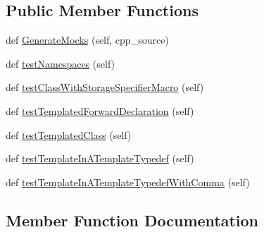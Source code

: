 \subsection*{Public Member Functions}
\begin{DoxyCompactItemize}
\item 
def \hyperlink{classcpp_1_1gmock__class__test_1_1_generate_mocks_test_afdce6749dca14c1aa90762d389d92c87}{Generate\+Mocks} (self, cpp\+\_\+source)
\item 
def \hyperlink{classcpp_1_1gmock__class__test_1_1_generate_mocks_test_a706812da9e8f79a689c707b4032db2d2}{test\+Namespaces} (self)
\item 
def \hyperlink{classcpp_1_1gmock__class__test_1_1_generate_mocks_test_aba1ab8ae8a897ea9c22a47bcd1524254}{test\+Class\+With\+Storage\+Specifier\+Macro} (self)
\item 
def \hyperlink{classcpp_1_1gmock__class__test_1_1_generate_mocks_test_a18cb0f03ecd4e54d0f787694c1513731}{test\+Templated\+Forward\+Declaration} (self)
\item 
def \hyperlink{classcpp_1_1gmock__class__test_1_1_generate_mocks_test_a4098c99b66f0cbea7be9e66352a20f4d}{test\+Templated\+Class} (self)
\item 
def \hyperlink{classcpp_1_1gmock__class__test_1_1_generate_mocks_test_a32a2840352d970c631d7be1b6d1970e6}{test\+Template\+In\+A\+Template\+Typedef} (self)
\item 
def \hyperlink{classcpp_1_1gmock__class__test_1_1_generate_mocks_test_a67d1336b8782257fcfcdbda8c8d4f794}{test\+Template\+In\+A\+Template\+Typedef\+With\+Comma} (self)
\end{DoxyCompactItemize}


\subsection{Member Function Documentation}
